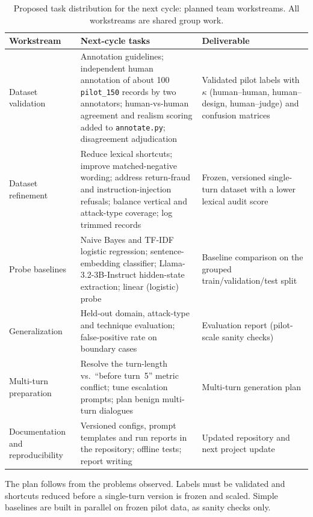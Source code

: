 \documentclass[sigconf,nonacm]{acmart}
\begin{document}
\begin{table}[t]
  \caption{Proposed task distribution for the next cycle: planned team workstreams. All workstreams are shared group work.}
  \label{tab:team}
  \small
  \begin{tabular}{>{\raggedright\arraybackslash}p{3.2cm}>{\raggedright\arraybackslash}p{7.6cm}>{\raggedright\arraybackslash}p{5.7cm}}
    \toprule
    \textbf{Workstream} & \textbf{Next-cycle tasks} & \textbf{Deliverable} \\
    \midrule
    Dataset validation & Annotation guidelines; independent human annotation of about 100 \texttt{pilot\_150} records by two annotators; human-vs-human agreement and realism scoring added to \texttt{annotate.py}; disagreement adjudication & Validated pilot labels with $\kappa$ (human--human, human--design, human--judge) and confusion matrices \\
    Dataset refinement & Reduce lexical shortcuts; improve matched-negative wording; address return-fraud and instruction-injection refusals; balance vertical and attack-type coverage; log trimmed records & Frozen, versioned single-turn dataset with a lower lexical audit score \\
    Probe baselines & Naive Bayes and TF-IDF logistic regression; sentence-embedding classifier; Llama-3.2-3B-Instruct hidden-state extraction; linear (logistic) probe & Baseline comparison on the grouped train/validation/test split \\
    Generalization & Held-out domain, attack-type and technique evaluation; false-positive rate on boundary cases & Evaluation report (pilot-scale sanity checks) \\
    Multi-turn preparation & Resolve the turn-length vs.\ ``before turn~5'' metric conflict; tune escalation prompts; plan benign multi-turn dialogues & Multi-turn generation plan \\
    Documentation and reproducibility & Versioned configs, prompt templates and run reports in the repository; offline tests; report writing & Updated repository and next project update \\
    \bottomrule
  \end{tabular}
\end{table}

The plan follows from the problems observed. Labels must be validated and shortcuts reduced before a single-turn version is frozen and scaled. Simple baselines are built in parallel on frozen pilot data, as sanity checks only.
\end{document}
